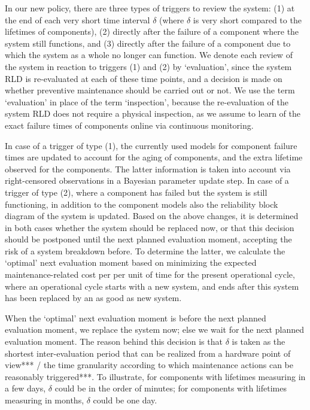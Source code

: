 \documentclass[authoryear]{elsarticle}
\begin{document}
In our new policy, there are three types of triggers to review the system:
(1) at the end of each very short time interval $\delta$ 
(where $\delta$ is very short compared to the lifetimes of components),
(2) directly after the failure of a component where the system still functions,
and (3) directly after the failure of a component due to which the system as a whole no longer can function. 
We denote each review of the system in reaction to triggers (1) and (2) by `evaluation',
since the system RLD is re-evaluated at each of these time points,
and a decision is made on whether preventive maintenance should be carried out or not.
We use the term `evaluation' in place of the term `inspection',
because the re-evaluation of the system RLD does not require a physical inspection,
as we assume to learn of the exact failure times of components online via continuous monitoring.

In case of a trigger of type (1),
the currently used models for component failure times are updated
to account for the aging of components,
and the extra lifetime observed for the components.
The latter information is taken into account via right-censored observations
in a Bayesian parameter update step.
In case of a trigger of type (2),
where a component has failed but the system is still functioning,
in addition to the component models also the reliability block diagram of the system is updated.
Based on the above changes,
it is determined in both cases whether the system should be replaced now,
or that this decision should be postponed until the next planned evaluation moment,
accepting the risk of a system breakdown before.
To determine the latter,
we calculate the `optimal' next evaluation moment %
based on minimizing the expected maintenance-related cost per per unit of time for the present operational cycle,
where an operational cycle starts with a new system, and ends after this system has been replaced by an as good as new system. 

When the `optimal' next evaluation moment is before the next planned evaluation moment, we replace the system now;
else we wait for the next planned evaluation moment.
The reason behind this decision is that $\delta$ is taken as %
the shortest inter-evaluation period that can be realized from a hardware point of view*** / 
the time granularity according to which maintenance actions can be reasonably triggered***.
To illustrate, for components with lifetimes measuring in a few days,
$\delta$ could be in the order of minutes;
for components with lifetimes measuring in months,
$\delta$ could be one day.
\end{document}
